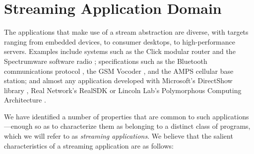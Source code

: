 \section{Streaming Application Domain}
\label{sec:domain}

The applications  that make use  of a stream abstraction  are diverse,
with targets  ranging from embedded devices, to  consumer desktops, to
high-performance servers.  Examples include  systems such as the Click
modular router \cite{click} and the Spectrumware software radio
\cite{spectrumware,softwareradio};   specifications    such   as   the
Bluetooth communications protocol \cite{bluetooth}, the GSM Vocoder
\cite{gsm}, and the AMPS cellular base station\cite{amps}; and almost
any application developed with Microsoft's DirectShow library
\cite{directshow}, Real Network's RealSDK \cite{realsdk} or Lincoln
Lab's Polymorphous Computing Architecture \cite{pca}.


We  have identified a  number of  properties that  are common  to such
applications---enough  so as  to characterize  them as  belonging  to a
distinct class of programs, which  we will refer to as \emph{streaming
applications}.   We  believe that  the  salient  characteristics of  a
streaming application are as follows:

